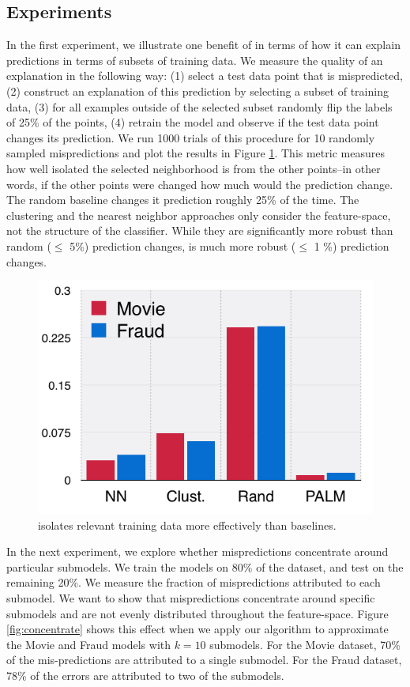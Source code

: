 \subsection{Experiments}

In the first experiment, we illustrate one benefit of \sys in terms of how it can explain predictions in terms of subsets of training data. We measure the quality of an explanation in the following way: (1) select a test data point that is mispredicted, (2) construct an explanation of this prediction by selecting a subset of training data, (3) for all examples outside of the selected subset randomly flip the labels of 25\% of the points, (4) retrain the model and observe if the test data point changes its prediction. 
We run 1000 trials of this procedure for 10 randomly sampled mispredictions and plot the results in Figure \ref{fig:isolation}. 
This metric measures how well isolated the selected neighborhood is from the other points--in other words, if the other points were changed how much would the prediction change.
The random baseline changes it prediction roughly 25\% of the time.
The clustering and the nearest neighbor approaches only consider the feature-space, not the structure of the classifier.
While they are significantly more robust than random ($\le$ 5\%) prediction changes, \sys is much more robust ($\le$ 1 \%) prediction changes.

\begin{figure}[ht]
    \centering
    \includegraphics[width=0.7\columnwidth]{figures/isolation.png}
    \caption{\sys isolates relevant training data more effectively than baselines.}
    \label{fig:isolation}
\end{figure}

In the next experiment, we explore whether mispredictions concentrate around particular submodels. We train the models on 80\% of the dataset, and test on the remaining 20\%. We measure the fraction of mispredictions attributed to each submodel. We want to show that mispredictions concentrate around specific submodels and are not evenly distributed throughout the feature-space. Figure \ref{fig:concentrate} shows this effect when we apply our algorithm to approximate the Movie and Fraud models with $k=10$ submodels. For the Movie dataset, 70\% of the mis-predictions are attributed to a single submodel.
For the Fraud dataset, 78\% of the errors are attributed to two of the submodels.

